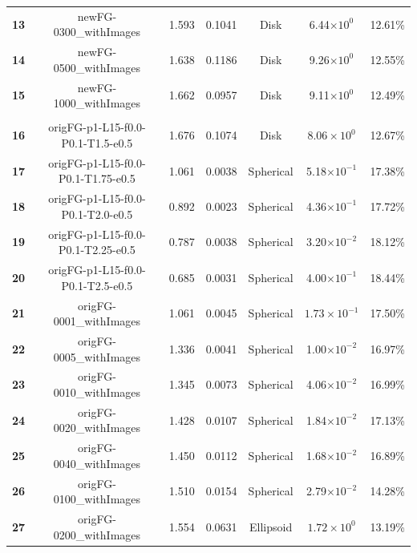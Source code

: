 \documentclass[12pt]{article}
\def\ccg{\cellcolor{gray}}
\begin{document}
\begin{center}
\begin{adjustbox}{max width=\textwidth}
\begin{tabular}{| c | c | c | c | c | c | c |}
\textbf{13}&\rule{0pt}{2.5ex}newFG-0300\_withImages&1.593&0.1041&Disk&6.44$\times 10^{0}$&12.61\%\\
{\ccg}\textbf{14}&{\ccg}\rule{0pt}{2.5ex}newFG-0500\_withImages&{\ccg}1.638&{\ccg}0.1186&{\ccg}Disk&{\ccg}9.26$\times 10^{0}$&{\ccg}12.55\%\\
\textbf{15}&\rule{0pt}{2.5ex}newFG-1000\_withImages&1.662&0.0957&Disk&9.11$\times 10^{0}$&12.49\%\\
\hhline{|=======|}
\multicolumn{7}{| c |}{{\ccg}OrigFG Runs}\\
\hhline{|=======|}
\textbf{16}&\rule{0pt}{2.5ex}origFG-p1-L15-f0.0-P0.1-T1.5-e0.5&1.676&0.1074&Disk&$8.06\times 10^{0}$&12.67\%\\
{\ccg}\textbf{17}&{\ccg}\rule{0pt}{2.5ex}origFG-p1-L15-f0.0-P0.1-T1.75-e0.5&{\ccg}1.061&{\ccg}0.0038&{\ccg}Spherical&{\ccg}5.18$\times 10^{-1}$&{\ccg}17.38\%\\
\textbf{18}&\rule{0pt}{2.5ex}origFG-p1-L15-f0.0-P0.1-T2.0-e0.5&0.892&0.0023&Spherical&4.36$\times 10^{-1}$&17.72\%\\
{\ccg}\textbf{19}&{\ccg}\rule{0pt}{2.5ex}origFG-p1-L15-f0.0-P0.1-T2.25-e0.5&{\ccg}0.787&{\ccg}0.0038&{\ccg}Spherical&{\ccg}3.20$\times 10^{-2}$&{\ccg}18.12\%\\
\textbf{20}&\rule{0pt}{2.5ex}origFG-p1-L15-f0.0-P0.1-T2.5-e0.5&0.685&0.0031&Spherical&4.00$\times 10^{-1}$&18.44\%\\
\hhline{|=======|}
{\ccg}\textbf{21}&{\ccg}\rule{0pt}{2.5ex}origFG-0001\_withImages&{\ccg} 1.061&{\ccg}0.0045&{\ccg}Spherical&{\ccg}$1.73\times 10^{-1}$&{\ccg}17.50\%\\
\textbf{22}&\rule{0pt}{2.5ex}origFG-0005\_withImages&1.336&0.0041&Spherical&1.00$\times 10^{-2}$&16.97\%\\
{\ccg}\textbf{23}&{\ccg}\rule{0pt}{2.5ex}origFG-0010\_withImages&{\ccg} 1.345&{\ccg}0.0073&{\ccg}Spherical&{\ccg}4.06$\times 10^{-2}$&{\ccg}16.99\%\\
\textbf{24}&\rule{0pt}{2.5ex}origFG-0020\_withImages&1.428&0.0107&Spherical&1.84$\times 10^{-2}$&17.13\%\\
{\ccg}\textbf{25}&{\ccg}\rule{0pt}{2.5ex}origFG-0040\_withImages&{\ccg} 1.450&{\ccg}0.0112&{\ccg}Spherical&{\ccg}1.68$\times 10^{-2}$&{\ccg}16.89\%\\
\textbf{26}&\rule{0pt}{2.5ex}origFG-0100\_withImages&1.510&0.0154&Spherical&2.79$\times 10^{-2}$&14.28\%\\
{\ccg}\textbf{27}&{\ccg}\rule{0pt}{2.5ex}origFG-0200\_withImages&{\ccg} 1.554&{\ccg}0.0631&{\ccg}Ellipsoid&{\ccg}$1.72\times 10^{0}$&{\ccg}13.19\%\\

\end{tabular}
\end{adjustbox}
\end{center}
\end{document}
